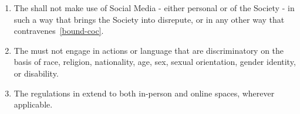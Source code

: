 \documentclass[a4paper,11pt,parskip=half-]{scrartcl} %
\begin{document}
\begin{enumerate}
        \item The \exec shall not make use of Social Media - either personal or of the Society - in such a way that brings the Society into disrepute, or in any other way that contravenes~\ref{bound-coc}.

        \item The \exec must not engage in actions or language that are discriminatory on the basis of race, religion, nationality, age, sex, sexual orientation, gender identity, or disability.
        
        \item The regulations in  extend to both in-person and online spaces, wherever applicable.
    \end{enumerate}
\end{document}
